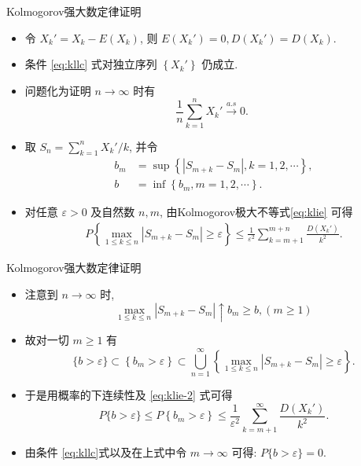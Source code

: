 \begin{frame}{Kolmogorov强大数定律证明}
\begin{itemize}[<+-|alert@+>]
	\item 令 \( X_{k}'=X_{k}-E\left(X_{k}\right) \), 则 \( E\left(X_{k}'\right)=0, D\left(X_{k}'\right)=D\left(X_{k}\right) \).
	\item  条件 \eqref{eq:kllc} 式对独立序列 \( \left\{X_{k}'\right\} \) 仍成立.
	\item 问题化为证明 \( n \rightarrow \infty \) 时有
	\[
	\frac{1}{n} \sum_{k=1}^{n} X_{k}' \stackrel{a . s}{\longrightarrow} 0 \text {. }
	\]

	\item 取 \( S_{n}=\sum_{k=1}^{n} X_{k}' / k \), 并令
\begin{align*}
	b_{m}&=\sup \left\{\left|S_{m+k}-S_{m}\right|, k=1,2, \cdots\right\},\\
	b&=\inf \left\{b_{m},  m=1,2, \cdots\right\}.
\end{align*}
\item 对任意 ${\varepsilon>0}$ 及自然数 $n, m$, 由Kolmogorov极大不等式\eqref{eq:klie} 可得
\begin{align}\label{eq:klie-2}
	P\left\{\max _{1 \leq k \leq n}\left|S_{m+k}-S_{m}\right| \geq \varepsilon\right\} \leq \frac{1}{\varepsilon^{2}} \sum_{k=m+1}^{m+n} \frac{D\left(X_{k}{\prime}\right)}{k^{2}} .
\end{align}


\end{itemize}

\end{frame}

\begin{frame}{Kolmogorov强大数定律证明}
	\begin{itemize}[<+-|alert@+>]
		\item 注意到 ${n \rightarrow \infty}$ 时,
		\[
		\max _{1 \leq k \leq n}\left|S_{m+k}-S_{m}\right| \uparrow b_{m} \geq b, (m \geq 1)
		\]
		\item
		故对一切 $m \geq 1$ 有
		\[
		\{b>\varepsilon\} \subset\left\{b_{m}>\varepsilon\right\} \subset \bigcup_{n=1}^{\infty}\left\{\max _{1 \leq k \leq n}\left|S_{m+k}-S_{m}\right| \geq \varepsilon\right\} .
		\]

		\item 于是用概率的下连续性及 \eqref{eq:klie-2} 式可得
		\[
		P\{b>\varepsilon\} \leq P\left\{b_{m}>\varepsilon\right\} \leq \frac{1}{\varepsilon^{2}} \sum_{k=m+1}^{\infty} \frac{D\left(X_{k}{\prime}\right)}{k^{2}} .
		\]
		\item 由条件 \eqref{eq:kllc}式以及在上式中令 $m \rightarrow \infty$ 可得: ${P\{b>\varepsilon\}=0}$.



	\end{itemize}

	\end{frame}


